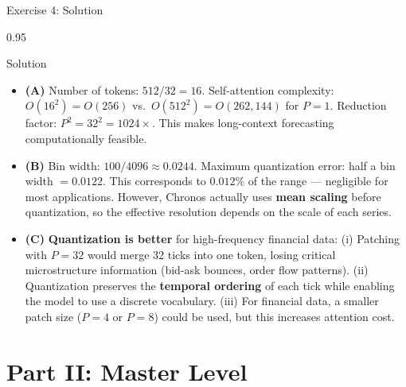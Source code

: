 \documentclass[9pt, aspectratio=169, t]{beamer}
\begin{document}
\begin{frame}{Exercise 4: Solution}
    \begin{cminipage}{0.95\textwidth}
    \begin{exampleblock}{Solution}
        {\footnotesize
        \begin{itemize}\setlength{\itemsep}{3pt}
            \item \textcolor{MainBlue}{\textbf{(A)}} Number of tokens: $512 / 32 = 16$. Self-attention complexity: $O(16^2) = O(256)$ vs.\ $O(512^2) = O(262{,}144)$ for $P = 1$. Reduction factor: $P^2 = 32^2 = 1024\times$. This makes long-context forecasting computationally feasible.
            \item \textcolor{MainBlue}{\textbf{(B)}} Bin width: $100 / 4096 \approx 0.0244$. Maximum quantization error: half a bin width $= 0.0122$. This corresponds to $0.012\%$ of the range --- negligible for most applications. However, Chronos actually uses \textbf{mean scaling} before quantization, so the effective resolution depends on the scale of each series.
            \item \textcolor{MainBlue}{\textbf{(C)}} \textbf{Quantization is better} for high-frequency financial data:
                (i) Patching with $P=32$ would merge 32 ticks into one token, losing critical microstructure information (bid-ask bounces, order flow patterns).
                (ii) Quantization preserves the \textbf{temporal ordering} of each tick while enabling the model to use a discrete vocabulary.
                (iii) For financial data, a smaller patch size ($P = 4$ or $P = 8$) could be used, but this increases attention cost.
        \end{itemize}
        }
    \end{exampleblock}
    \end{cminipage}
\end{frame}

\section{Part II: Master Level}
\end{document}
